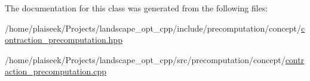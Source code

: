 The documentation for this class was generated from the following files\+:\begin{DoxyCompactItemize}
\item 
/home/plaiseek/\+Projects/landscape\+\_\+opt\+\_\+cpp/include/precomputation/concept/\hyperlink{contraction__precomputation_8hpp}{contraction\+\_\+precomputation.\+hpp}\item 
/home/plaiseek/\+Projects/landscape\+\_\+opt\+\_\+cpp/src/precomputation/concept/\hyperlink{contraction__precomputation_8cpp}{contraction\+\_\+precomputation.\+cpp}\end{DoxyCompactItemize}
